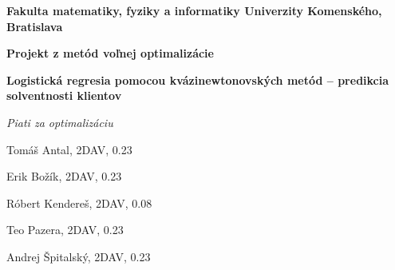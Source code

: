 \documentclass[12pt,oneside,a4paper,slovak]{article}
\begin{document}
	\setcounter{section}{-1}
	\begin{titlepage}
		\large
		
		\begin{center}
			\textbf{Fakulta matematiky, fyziky a informatiky Univerzity Komenského, Bratislava}
			
			\vspace{7.5cm}
			
			\LARGE\textbf{Projekt z metód voľnej optimalizácie}
			
			\vspace{1cm}
			
			\LARGE\textbf{ Logistická regresia pomocou kvázinewtonovských metód -- predikcia solventnosti klientov}
			
			\bigskip 
		\end{center}
			
		\vfill
		
		\hfill
		\begin{minipage}{0.5\textwidth}
			\raggedleft
			
			\textit{Piati za optimalizáciu}
	
			Tomáš Antal, 2DAV, 0.23
			
			Erik Božík, 2DAV, 0.23
			
			Róbert Kendereš, 2DAV, 0.08
			
			Teo Pazera, 2DAV, 0.23
			
			Andrej Špitalský, 2DAV, 0.23
		\end{minipage}
			
	\end{titlepage}
	
	\tableofcontents
	\newpage
	
	
	\newpage
	
	\newpage
	
	\newpage
	
	\newpage
	
	\newpage
	
	\newpage
	
	\newpage
	
	\newpage
	
\end{document}
